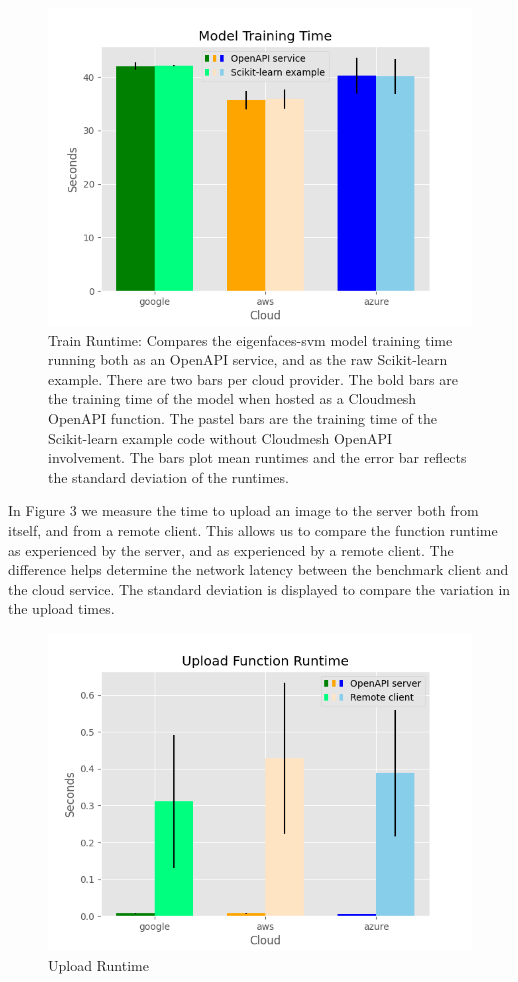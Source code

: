 \begin{figure}[htb]
\centering
\includegraphics[width=\columnwidth]{../images/sample_graph_2.png}
\caption{Train Runtime: Compares the eigenfaces-svm model training time
running both as an OpenAPI service, and as the raw Scikit-learn example.
There are two bars per cloud provider. The bold bars are the training
time of the model when hosted as a Cloudmesh OpenAPI function. The
pastel bars are the training time of the Scikit-learn example code
without Cloudmesh OpenAPI involvement. The bars plot mean runtimes and
the error bar reflects the standard deviation of the runtimes.}
\label{fig:4}
\end{figure}

In Figure 3 we measure the time to upload an image to the server both
from itself, and from a remote client. This allows us to compare the
function runtime as experienced by the server, and as experienced by a
remote client. The difference helps determine the network latency
between the benchmark client and the cloud service. The standard
deviation is displayed to compare the variation in the upload times.

\begin{figure}
\centering
\includegraphics[width=\columnwidth]{../images/sample_graph_3.png}
\caption{Upload Runtime}
\end{figure}

